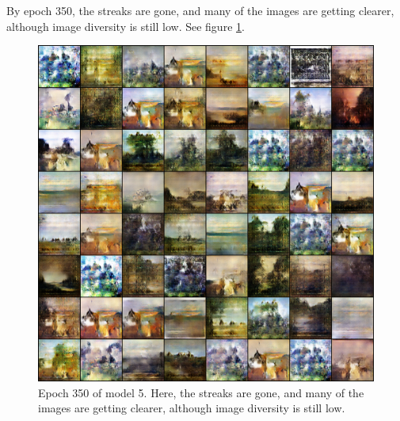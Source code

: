\documentclass[11pt,letterpaper]{article}
\begin{document}
				By epoch 350, the streaks are gone, and many of the images are getting clearer, although image diversity is still low.
				See figure \ref{fig:wa128:epoch350generator}.
				\begin{figure}
					\centering
					\includegraphics[width=1.0\linewidth]{results/model5/epoch350_generator}
					\caption{Epoch 350 of model 5. Here, the streaks are gone, and many of the images are getting clearer, although image diversity is still low.}
					\label{fig:wa128:epoch350generator}
				\end{figure}
\end{document}
